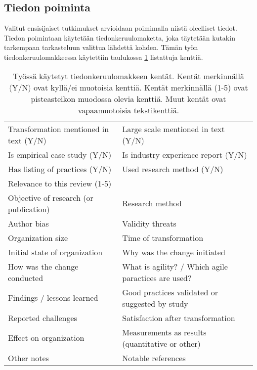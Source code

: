 \subsection{Tiedon poiminta}

Valitut ensisijaiset tutkimukset arvioidaan poimimalla niistä oleelliset tiedot.
Tiedon poimintaan käytetään tiedonkeruulomaketta, joka täytetään kutakin
tarkempaan tarkasteluun valittua lähdettä kohden. Tämän työn
tiedonkeruulomakkeessa käytettiin taulukossa \ref{table:dataform} listattuja
kenttiä.

\begin{table}
    \begin{tabular}{|l|l|}
        \hline
        Transformation mentioned in text (Y/N) &
        Large scale mentioned in text (Y/N) \\
        Is empirical case study (Y/N) &
        Is industry experience report (Y/N) \\
        Has listing of practices (Y/N) &
        Used research method (Y/N) \\
        Relevance to this review (1-5) & \\
        Objective of research (or publication) &
        Research method \\
        Author bias &
        Validity threats \\
        Organization size &
        Time of transformation \\
        Initial state of organization &
        Why was the change initiated \\
        How was the change conducted &
        What is agility? / Which agile paractices are used? \\
        Findings / lessons learned &
        Good practices validated or suggested by study \\
        Reported challenges &
        Satisfaction after transformation \\
        Effect on organization &
        Measurements as results (quantitative or other) \\
        Other notes &
        Notable references \\
        \hline
    \end{tabular}
    \caption{Työssä käytetyt tiedonkeruulomakkeen kentät. Kentät merkinnällä
    (Y/N) ovat kyllä/ei muotoisia kenttiä. Kentät merkinnällä (1-5) ovat
    pisteasteikon muodossa olevia kenttiä. Muut kentät ovat vapaamuotoisia
    tekstikenttiä.}
    \label{table:dataform}
\end{table}


